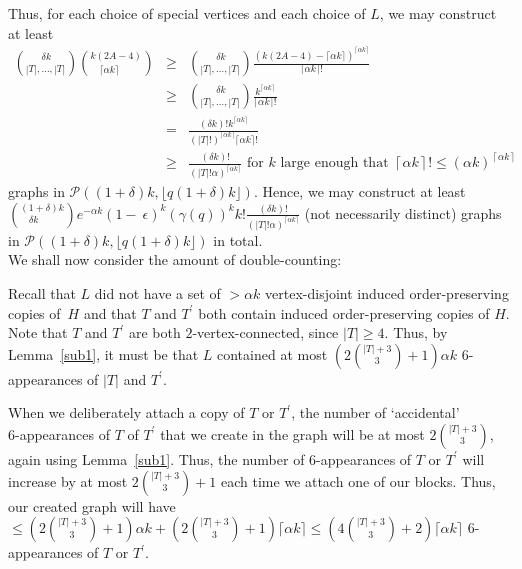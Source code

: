 \documentclass{article}
\newtheorem{Proof of Theorem}{Proof of Theorem}
\begin{document}
Thus, for each choice of special vertices and each choice of $L$, we may construct at least
\begin{eqnarray*}
\left( ^{\phantom{qqw}\delta k}_{|T|, \ldots, |T|} \right) \left( ^{k(2A-4)}_{\phantom{qq}\lceil \alpha k \rceil} \right)
& \geq & \left( ^{\phantom{qqw}\delta k}_{|T|, \ldots, |T|} \right)
\frac{\left( k(2A-4) - \lceil \alpha k \rceil \right)^{\lceil \alpha k \rceil}}{\lceil \alpha k \rceil !} \\
& \geq & \left( ^{\phantom{qqw}\delta k}_{|T|, \ldots, |T|} \right)
\frac{k^{\lceil \alpha k \rceil}}{\lceil \alpha k \rceil !} \\
& = & \frac{(\delta k)! k^{\lceil \alpha k \rceil}}{(|T|!)^{\lceil \alpha k \rceil} \lceil \alpha k \rceil !} \\
& \geq & \frac{(\delta k)!} {(|T|! \alpha)^{\lceil \alpha k \rceil}} 
\textrm{ for $k$ large enough that } 
\left \lceil \alpha k \right \rceil ! \!\leq\! \left( \alpha k \right)^{\left \lceil \alpha k \right \rceil} 
\end{eqnarray*}
graphs in $\mathcal{P}((1+\delta)k, \lfloor q(1+\delta)k \rfloor)$.
Hence,
we may construct at least \\
$\left( ^{(1+\delta)k}_{\phantom{qq} \delta k} \right) e^{- \alpha k} (1 -~\epsilon)^{k} (\gamma(q))^{k} k! 
\frac{(\delta k)!}{(|T|! \alpha)^{\lceil \alpha k \rceil}}$
(not necessarily distinct) graphs in $\mathcal{P}((1+\delta)k, \lfloor q(1+\delta)k \rfloor)$ in total. \\

We shall now consider the amount of double-counting:

Recall that $L$ did not have a set of $> \alpha k$ vertex-disjoint induced order-preserving copies of~$H$
and that $T$ and $T^{\prime}$ both contain induced order-preserving copies of $H$.
Note that $T$ and $T^{\prime}$ are both $2$-vertex-connected, since $|T| \geq 4$.
Thus, by Lemma~\ref{sub1}, it must be that $L$ contained at most 
$\left( 2 \left( ^{|T|+3} _{\phantom{qw}3} \right) +1 \right) \alpha k$  
$6$-appearances of $|T|$ and $T^{\prime}$.

When we deliberately attach a copy of $T$ or $T^{\prime}$,
the number of `accidental' \\ $6$-appearances of $T$ of $T^{\prime}$ that we create in the graph
will be at most $2 \left( ^{|T|+3} _{\phantom{qw}3} \right)$, again using Lemma~\ref{sub1}.
Thus, the number of $6$-appearances of $T$ or $T^{\prime}$ will increase by at most 
$2 \left( ^{|T|+3} _{\phantom{qw}3} \right) + 1$ each time we attach one of our blocks.
Thus, our created graph will have 
$\leq \left( 2 \left( ^{|T|+3} _{\phantom{qw}3} \right) +1 \right) \alpha k + 
\left( 2 \left( ^{|T|+3} _{\phantom{qw}3} \right) + 1 \right) \lceil \alpha k \rceil
\leq \left( 4 \left( ^{|T|+3} _{\phantom{qw}3} \right) + 2 \right) \lceil \alpha k \rceil$
$6$-appearances of $T$ or $T^{\prime}$.
\end{document}
